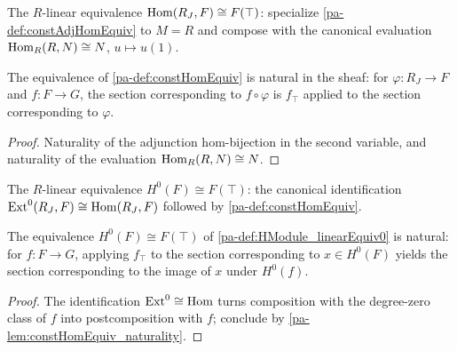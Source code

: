 \begin{definition}
  \label{pa-def:constHomEquiv}
  \leanok

  The \(R\)-linear equivalence
  \(\operatorname{Hom}(R_J, F) \cong F(\top)\): specialize \ref{pa-def:constAdjHomEquiv} to \(M = R\) and
  compose with the canonical evaluation \(\operatorname{Hom}_R(R, N) \cong N\), \(u \mapsto u(1)\).
\end{definition}

\begin{lemma}[Naturality]
  \label{pa-lem:constHomEquiv_naturality}
  \leanok

  The equivalence of \ref{pa-def:constHomEquiv} is natural in the sheaf: for
  \(\varphi : R_J \to F\) and \(f : F \to G\), the section corresponding to
  \(f \circ \varphi\) is \(f_\top\) applied to the section corresponding to \(\varphi\).
\end{lemma}
\begin{proof}
  \leanok
  Naturality of the adjunction hom-bijection in the second variable, and naturality of the
  evaluation \(\operatorname{Hom}_R(R, N) \cong N\).
\end{proof}

\begin{definition}
  \label{pa-def:HModule_linearEquiv0}
  \leanok

  The \(R\)-linear equivalence \(H^0(F) \cong F(\top)\): the canonical identification
  \(\operatorname{Ext}^0(R_J, F) \cong \operatorname{Hom}(R_J, F)\) followed by \ref{pa-def:constHomEquiv}.
\end{definition}

\begin{lemma}
  \label{pa-lem:HModule_linearEquiv0_naturality}
  \leanok

  The equivalence \(H^0(F) \cong F(\top)\) of \ref{pa-def:HModule_linearEquiv0} is natural: for
  \(f : F \to G\), applying \(f_\top\) to the section corresponding to \(x \in H^0(F)\)
  yields the section corresponding to the image of \(x\) under \(H^0(f)\).
\end{lemma}
\begin{proof}
  \leanok
  The identification \(\operatorname{Ext}^0 \cong \operatorname{Hom}\) turns composition with the degree-zero class of
  \(f\) into postcomposition with \(f\); conclude by \ref{pa-lem:constHomEquiv_naturality}.
\end{proof}

